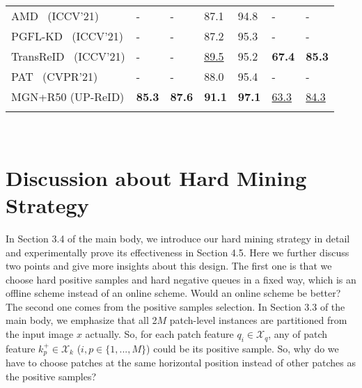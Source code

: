 \documentclass[10pt,twocolumn,letterpaper]{article}
\begin{document}
\begin{table*}[t!]
\begin{tabular}{P{4.5cm}|C{1.4cm}C{1.4cm}|C{1.4cm}C{1.4cm}|C{1.4cm}C{1.4cm}}
		AMD~\cite{chen2021explainable} (ICCV'21) & - & - & 87.1 & 94.8 & - & - \\
		PGFL-KD~\cite{zheng2021pose} (ICCV'21) & - & - & 87.2 & 95.3 & - & - \\
		TransReID~\cite{he2021transreid} (ICCV'21) & - & - & \underline{89.5} & 95.2 & \textbf{67.4} & \textbf{85.3} \\
		PAT~\cite{li2021diverse} (CVPR'21) & - & - & 88.0 & 95.4 & - & - \\
		\hline
		MGN+R50 (UP-ReID) & \textbf{85.3} & \textbf{87.6} & \textbf{91.1} & \textbf{97.1} & \underline{63.3} & \underline{84.3} \\
		\shline
	\end{tabular}\\
	\label{tab:sota2}
\end{table*}


\section{Discussion about Hard Mining Strategy}
In Section 3.4 of the main body, we introduce our hard mining strategy in detail and experimentally prove its effectiveness in Section 4.5. Here we further discuss two points and give more insights about this design. The first one is that we choose hard positive samples and hard negative queues in a fixed way, which is an offline scheme instead of an online scheme. Would an online scheme be better? The second one comes from the positive samples selection. In Section 3.3 of the main body, we emphasize that all 2$M$ patch-level instances are partitioned from the input image $x$ actually. So, for each patch feature $q_i\in \mathcal{X}_{q}$, any of patch feature $k^+_p\in \mathcal{X}_{k}$ ($i,p \in \{1,...,M\}$) could be its positive sample. So, why do we have to choose patches at the same horizontal position instead of other patches as the positive samples?

\end{document}
